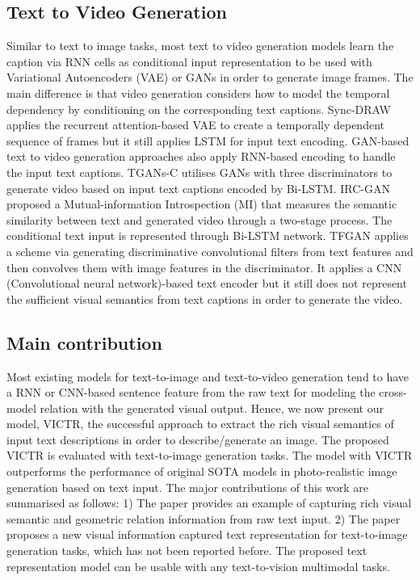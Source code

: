 \documentclass[11pt]{article}
\begin{document}
\subsection{Text to Video Generation}
Similar to text to image tasks, most text to video generation models learn the caption via RNN cells as conditional input representation to be used with Variational Autoencoders (VAE) or GANs in order to generate image frames. The main difference is that video generation considers how to model the temporal dependency by conditioning on the corresponding text captions. Sync-DRAW \cite{mittal2017sync} applies the recurrent attention-based VAE to create a temporally dependent sequence of frames but it still applies LSTM for input text encoding. GAN-based text to video generation approaches also apply RNN-based encoding to handle the input text captions. TGANs-C \cite{pan2017create} utilises GANs with three discriminators to generate video based on input text captions encoded by Bi-LSTM. IRC-GAN \cite{deng2019irc} proposed a Mutual-information Introspection (MI) that measures the semantic similarity between text and generated video through a two-stage process. The conditional text input is represented through Bi-LSTM network. TFGAN \cite{balaji2019conditional} applies a scheme via generating discriminative convolutional filters from text features and then convolves them with image features in the discriminator. It applies a CNN (Convolutional neural network)-based text encoder but it still does not represent the sufficient visual semantics from text captions in order to generate the video.

\subsection{Main contribution} \label{section:maincon}
Most existing models for text-to-image and text-to-video generation tend to have a RNN or CNN-based sentence feature from the raw text for modeling the cross-model relation with the generated visual output. Hence, we now present our model, VICTR, the successful approach to extract the rich visual semantics of input text descriptions in order to describe/generate an image.
The proposed VICTR is evaluated with text-to-image generation tasks. The model with VICTR outperforms the performance of original SOTA models in photo-realistic image generation based on text input. The major contributions of this work are summarised as follows:
1) The paper provides an example of capturing rich visual semantic and geometric relation information from raw text input. 
2) The paper proposes a new visual information captured text representation for text-to-image generation tasks, which has not been reported before. The proposed text representation model can be usable with any text-to-vision multimodal tasks.
\end{document}
